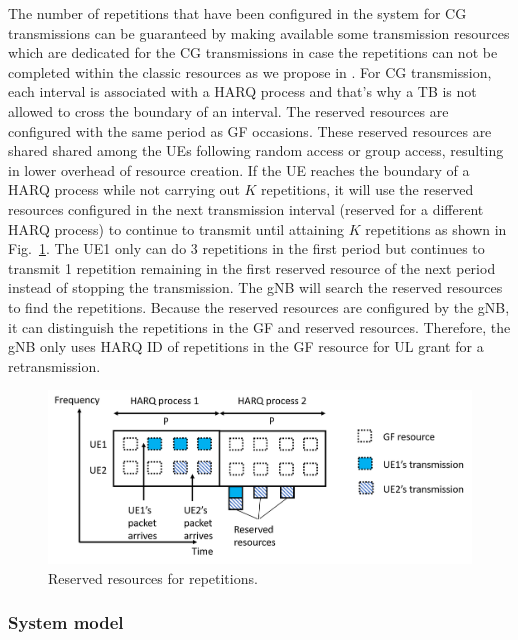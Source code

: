 \documentclass{ieeeaccess}
\begin{document}
The number of repetitions that have been configured in the system for CG transmissions can be guaranteed by making available some transmission resources which are dedicated for the CG transmissions in case the repetitions can not be completed within the classic resources as we propose in \cite{b9}. For CG transmission, each interval is associated with a HARQ process and that's why a TB is not allowed to cross the boundary of an interval. The reserved resources are configured with the same period as GF occasions. These reserved resources are shared shared among the UEs following random access or group access, resulting in lower overhead of resource creation. If the UE reaches the boundary of a HARQ process while not carrying out $K$ repetitions, it will use the reserved resources configured in the next transmission interval (reserved for a different HARQ process) to continue to transmit until attaining $K$ repetitions as shown in Fig.~\ref{fig5}. The UE1 only can do 3 repetitions in the first period but continues to transmit 1 repetition remaining in the first reserved resource of the next period instead of stopping the transmission. The gNB will search the reserved resources to find the repetitions. Because the reserved resources are configured by the gNB, it can distinguish the repetitions in the GF and reserved resources. Therefore, the gNB only uses HARQ ID of repetitions in the GF resource for UL grant for a retransmission.

\begin{figure}[htbp]
\centerline{\includegraphics[scale=0.32]{fig5.png}}
\caption{Reserved resources for repetitions.}
\label{fig5}
\vspace{-2mm}
\end{figure}

\subsubsection{System model} \label{IIIB2}
\end{document}
